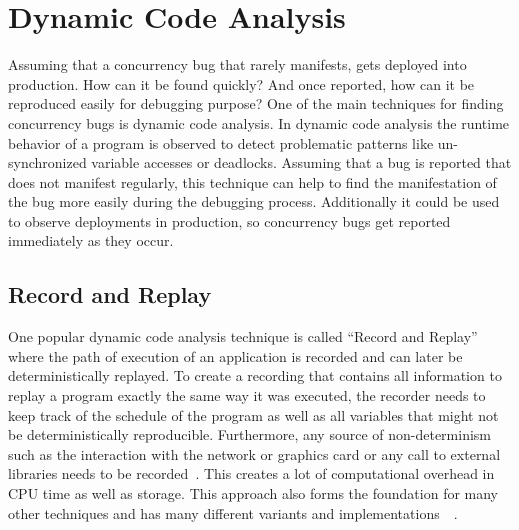 \documentclass[english]{lni}
\begin{document}
\section{Dynamic Code Analysis}
\label{sct:dynamic}

Assuming that a concurrency bug that rarely manifests, gets deployed into production.
How can it be found quickly?
And once reported, how can it be reproduced easily for debugging purpose?
One of the main techniques for finding concurrency bugs is dynamic code analysis.
In dynamic code analysis the runtime behavior of a program is observed to detect problematic patterns like un-synchronized variable accesses or deadlocks.
Assuming that a bug is reported that does not manifest regularly, this technique can help to find the manifestation of the bug more easily during the debugging process.
Additionally it could be used to observe deployments in production, so concurrency bugs get reported immediately as they occur.

\subsection{Record and Replay}
One popular dynamic code analysis technique is called ``Record and Replay'' where the path of execution of an application is recorded and can later be deterministically replayed.
To create a recording that contains all information to replay a program exactly the same way it was executed, the recorder needs to keep track of the schedule of the program as well as all variables that might not be deterministically reproducible.
Furthermore, any source of non-determinism such as the interaction with the network or graphics card or any call to external libraries needs to be recorded~\cite{lidbury2019sparse}.
This creates a lot of computational overhead in CPU time as well as storage.
This approach also forms the foundation for many other techniques and has many different variants and implementations~\cite{acm2002}~\cite{lidbury2019sparse}.
\end{document}
